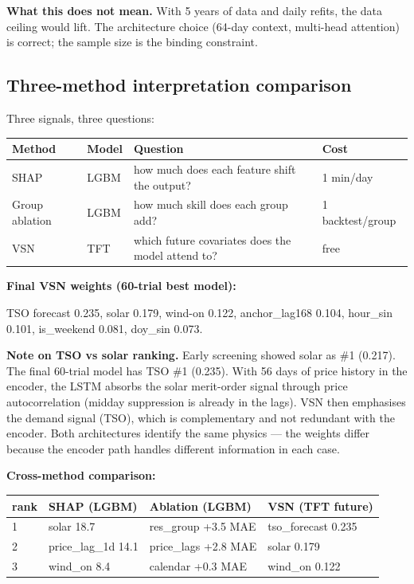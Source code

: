 \textbf{What this does not mean.} With 5 years of data and daily refits,
the data ceiling would lift. The architecture choice (64-day context,
multi-head attention) is correct; the sample size is the binding constraint.

\subsection{Three-method interpretation comparison}

Three signals, three questions:

\begin{center}
\begin{tabular}{llll}
\toprule
Method & Model & Question & Cost \\
\midrule
SHAP & LGBM & how much does each feature shift the output? & 1 min/day \\
Group ablation & LGBM & how much skill does each group add? & 1 backtest/group \\
VSN & TFT & which future covariates does the model attend to? & free \\
\bottomrule
\end{tabular}
\end{center}

\textbf{Final VSN weights (60-trial best model):}

TSO forecast 0.235, solar 0.179, wind-on 0.122, anchor\_lag168 0.104,
hour\_sin 0.101, is\_weekend 0.081, doy\_sin 0.073.

\textbf{Note on TSO vs solar ranking.} Early screening showed solar as \#1 (0.217).
The final 60-trial model has TSO \#1 (0.235). With 56 days of price history in the
encoder, the LSTM absorbs the solar merit-order signal through price autocorrelation
(midday suppression is already in the lags). VSN then emphasises the demand signal
(TSO), which is complementary and not redundant with the encoder.
Both architectures identify the same physics --- the weights differ because the
encoder path handles different information in each case.

\textbf{Cross-method comparison:}

\begin{center}
\begin{tabular}{llll}
\toprule
rank & SHAP (LGBM) & Ablation (LGBM) & VSN (TFT future) \\
\midrule
1 & solar 18.7 & res\_group +3.5 MAE & tso\_forecast 0.235 \\
2 & price\_lag\_1d 14.1 & price\_lags +2.8 MAE & solar 0.179 \\
3 & wind\_on 8.4 & calendar +0.3 MAE & wind\_on 0.122 \\
\bottomrule
\end{tabular}
\end{center}

